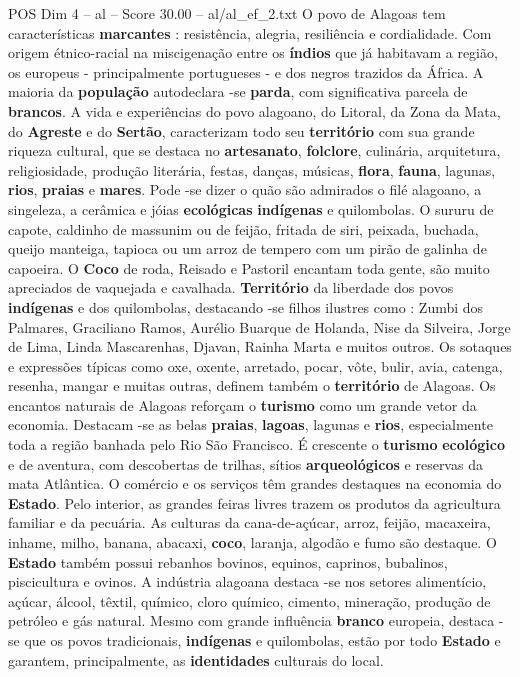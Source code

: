 \begin{textsample}{POS Dim 4 – al – Score 30.00 – al/al\_ef\_2.txt}
O povo de Alagoas tem características \textbf{marcantes} : resistência, alegria, resiliência e cordialidade.
Com origem étnico-racial na miscigenação entre os \textbf{índios} que já habitavam a região, os europeus - principalmente portugueses - e dos negros trazidos da África.
A maioria da \textbf{população} autodeclara -se \textbf{parda}, com significativa parcela de \textbf{brancos}.
A vida e experiências do povo alagoano, do Litoral, da Zona da Mata, do \textbf{Agreste} e do \textbf{Sertão}, caracterizam todo seu \textbf{território} com sua grande riqueza cultural, que se destaca no \textbf{artesanato}, \textbf{folclore}, culinária, arquitetura, religiosidade, produção literária, festas, danças, músicas, \textbf{flora}, \textbf{fauna}, lagunas, \textbf{rios}, \textbf{praias} e \textbf{mares}.
Pode -se dizer o quão são admirados o filé alagoano, a singeleza, a cerâmica e jóias \textbf{ecológicas} \textbf{indígenas} e quilombolas.
O sururu de capote, caldinho de massunim ou de feijão, fritada de siri, peixada, buchada, queijo manteiga, tapioca ou um arroz de tempero com um pirão de galinha de capoeira.
O \textbf{Coco} de roda, Reisado e Pastoril encantam toda gente, são muito apreciados de vaquejada e cavalhada. \textbf{Território} da liberdade dos povos \textbf{indígenas} e dos quilombolas, destacando -se filhos ilustres como : Zumbi dos Palmares, Graciliano Ramos, Aurélio Buarque de Holanda, Nise da Silveira, Jorge de Lima, Linda Mascarenhas, Djavan, Rainha Marta e muitos outros.
Os sotaques e expressões típicas como oxe, oxente, arretado, pocar, vôte, bulir, avia, catenga, resenha, mangar e muitas outras, definem também o \textbf{território} de Alagoas.
Os encantos naturais de Alagoas reforçam o \textbf{turismo} como um grande vetor da economia.
Destacam -se as belas \textbf{praias}, \textbf{lagoas}, lagunas e \textbf{rios}, especialmente toda a região banhada pelo Rio São Francisco.
É crescente o \textbf{turismo} \textbf{ecológico} e de aventura, com descobertas de trilhas, sítios \textbf{arqueológicos} e reservas da mata Atlântica.
O comércio e os serviços têm grandes destaques na economia do \textbf{Estado}.
Pelo interior, as grandes feiras livres trazem os produtos da agricultura familiar e da pecuária.
As culturas da cana-de-açúcar, arroz, feijão, macaxeira, inhame, milho, banana, abacaxi, \textbf{coco}, laranja, algodão e fumo são destaque.
O \textbf{Estado} também possui rebanhos bovinos, equinos, caprinos, bubalinos, piscicultura e ovinos.
A indústria alagoana destaca -se nos setores alimentício, açúcar, álcool, têxtil, químico, cloro químico, cimento, mineração, produção de petróleo e gás natural.
Mesmo com grande influência \textbf{branco} europeia, destaca -se que os povos tradicionais, \textbf{indígenas} e quilombolas, estão por todo \textbf{Estado} e garantem, principalmente, as \textbf{identidades} culturais do local.

\end{textsample}
